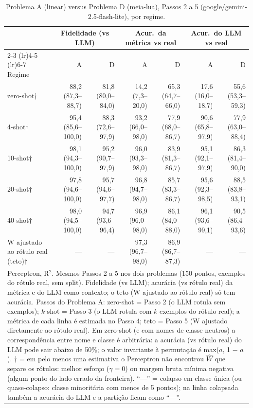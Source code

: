 \begin{table}[htbp]
\centering
\small
\caption{Problema A (linear) versus Problema D (meia-lua), Passos 2 a 5 (google/gemini-2.5-flash-lite), por regime.}
\label{tab:bloco1_AD_por_passo_flashlite}
\begin{tabular}{lrrrrrr}
\toprule
 & \multicolumn{2}{c}{Fidelidade (vs LLM)} & \multicolumn{2}{c}{Acur.\ da métrica vs real} & \multicolumn{2}{c}{Acur.\ do LLM vs real} \\ \cmidrule(lr){2-3} \cmidrule(lr){4-5} \cmidrule(lr){6-7}
Regime & A & D & A & D & A & D \\
\midrule
zero-shot† & 88,2 (87,3–88,7) & 81,8 (80,0–84,0) & 14,2 (7,3–20,0) & 65,3 (64,7–66,0) & 17,6 (16,0–18,7) & 55,6 (53,3–59,3) \\
4-shot† & 95,4 (85,6–100,0) & 88,3 (72,6–97,9) & 93,2 (66,0–98,0) & 77,9 (68,0–86,7) & 90,6 (65,8–97,9) & 77,9 (63,0–88,4) \\
10-shot† & 98,1 (94,3–100,0) & 95,2 (90,7–97,9) & 96,0 (93,3–98,0) & 83,9 (81,3–86,7) & 95,1 (92,1–97,9) & 86,3 (81,4–90,0) \\
20-shot† & 97,8 (94,6–100,0) & 95,7 (94,6–97,7) & 96,8 (94,7–98,0) & 85,7 (83,3–86,7) & 95,6 (92,3–98,5) & 88,5 (83,8–93,1) \\
40-shot† & 98,0 (94,5–100,0) & 94,7 (93,6–96,4) & 96,9 (96,0–98,0) & 86,1 (84,0–88,0) & 96,1 (93,6–99,1) & 90,5 (86,4–93,6) \\
\midrule
W ajustado ao rótulo real (teto)† & — & — & 97,3 (96,7–98,0) & 86,9 (86,7–87,3) & — & — \\
\bottomrule
\multicolumn{7}{p{0.95\linewidth}}{\footnotesize Perceptron, R$^2$. Mesmos Passos 2 a 5 nos dois problemas (150 pontos, exemplos do rótulo real, sem split). Fidelidade (vs LLM); acurácia (vs rótulo real) da métrica e do LLM como contexto; o teto (W ajustado ao rótulo real) só tem acurácia. Passos do Problema A: zero-shot = Passo 2 (o LLM rotula sem exemplos); $k$-shot = Passo 3 (o LLM rotula com $k$ exemplos do rótulo real); a métrica de cada linha é estimada no Passo 4; teto = Passo 5 (W ajustado diretamente ao rótulo real). Em zero-shot (e com nomes de classe neutros) a correspondência entre nome e classe é arbitrária: a acurácia (vs rótulo real) do LLM pode sair abaixo de 50\%; o valor invariante à permutação é max($a$, 1 $-$ $a$). † = em pelo menos uma estimativa o Perceptron não encontrou $\hat{W}$ que separe os rótulos: melhor esforço ($\gamma = 0$) ou margem bruta mínima negativa (algum ponto do lado errado da fronteira). ``—'' = colapso em classe única (ou quase-colapso: classe minoritária com menos de 5 pontos); na linha colapsada também a acurácia do LLM e a partição ficam como ``—''.} \\
\end{tabular}
\end{table}
